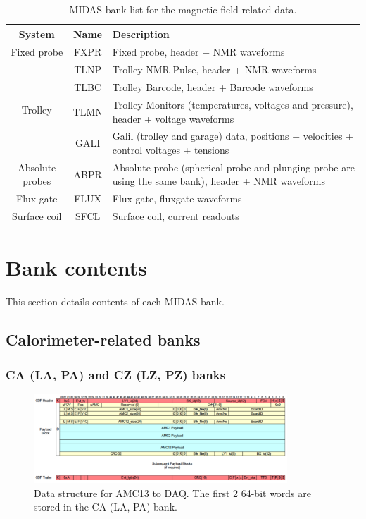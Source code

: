 \begin{table}[htbp]
\centering
\caption{MIDAS bank list for the magnetic field related data.}
\begin{tabular}{|c|c|p{11cm}|}
\hline
System & Name & Description \\
\hline
Fixed probe & FXPR & Fixed probe, header + NMR waveforms \\
\hline
\multirow{4}{*}{Trolley} & TLNP & Trolley NMR Pulse, header + NMR waveforms\\
\cline{2-3}
& TLBC &  Trolley Barcode, header + Barcode waveforms \\
\cline{2-3}
& TLMN & Trolley Monitors (temperatures, voltages and pressure), header + voltage waveforms \\
\cline{2-3}
& GALI &  Galil (trolley and garage) data, positions + velocities + control voltages + tensions\\
\hline
Absolute probes &  ABPR &
Absolute probe (spherical probe and plunging probe are using the same bank), header + NMR waveforms \\ 
\hline
Flux gate & FLUX & Flux gate, fluxgate waveforms \\
\hline
Surface coil & SFCL & Surface coil, current readouts\\
\hline
\end{tabular} 
\label{tab:fieldtable}
\end{table}

\section{Bank contents}

This section details contents of each MIDAS bank. 

\subsection{Calorimeter-related banks}

\subsubsection*{CA (LA, PA) and CZ (LZ, PZ) banks}

\begin{figure}[htbp]
\centering
\includegraphics[width=0.85\textwidth]{pics/AMC13ToDAQ.pdf} 
\caption{Data structure for AMC13 to DAQ. The first 2 64-bit words are stored in the CA (LA, PA) bank.}\label{fig:AMC13ToDAQ}
\end{figure}

